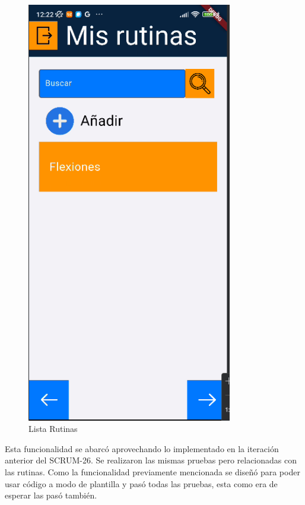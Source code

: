 \begin{figure}[H]
   \centering
    \includegraphics[width=0.8\textwidth]{pantallas/listaRutinas.png}
    \caption{Lista Rutinas}
    \label{fig:listaRutinas}
\end{figure}

Esta funcionalidad se abarcó aprovechando lo implementado en la iteración anterior del SCRUM-26. Se realizaron las mismas pruebas pero relacionadas con las rutinas. Como la funcionalidad previamente mencionada se diseñó para poder usar código a modo de plantilla y pasó todas las pruebas, esta como era de esperar las pasó también.

